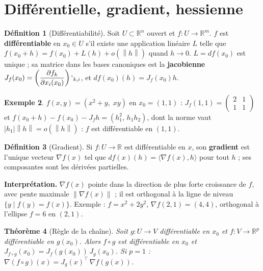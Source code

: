 \documentclass[a4paper,11pt]{report}
\theoremstyle{plain}
\newtheorem{theorem}{Théorème}[]
\theoremstyle{definition}
\newtheorem{definition}[theorem]{Définition}
\newtheorem{exemple}[theorem]{Exemple}
\theoremstyle{remark}
\newcommand{\R}{\mathbb{R}}
\newcommand{\norm}[1]{\left\lVert#1\right\rVert}
\newcommand{\abs}[1]{\left\lvert#1\right\rvert}
\newcommand{\grad}{\nabla}
\newcommand{\T}{^{\!\top}}
\newcommand{\scal}[2]{\langle #1,#2\rangle}
\begin{document}
			\section{Différentielle, gradient, hessienne}
			\begin{definition}[Différentiabilité]
				Soit $U\subset\R^n$ ouvert et $f:U\to\R^m$. $f$ est \textbf{différentiable} en $x_0\in U$ s'il existe une application linéaire $L$ telle que $f(x_0+h)=f(x_0)+L(h)+o(\norm h)$ quand $h\to0$. $L=df(x_0)$ est unique ; sa matrice dans les bases canoniques est la \textbf{jacobienne} $J_f(x_0)=\left( \dfrac{\partial f_k}{\partial x_i(x_0)}\right) `_{k,i}$, et $df(x_0)(h)=J_f(x_0)h$.
			\end{definition}
			\begin{exemple}
				$f(x,y)=(x^2+y,\;xy)$ en $x_0=(1,1)$ : $J_f(1,1)=\begin{pmatrix}2&1\\1&1\end{pmatrix}$ et $f(x_0+h)-f(x_0)-J_f h=(h_1^2,\,h_1h_2)$, dont la norme vaut $\abs{h_1}\norm h=o(\norm h)$ : $f$ est différentiable en $(1,1)$.
			\end{exemple}
			\begin{definition}[Gradient]
				Si $f:U\to\R$ est différentiable en $x$, son \textbf{gradient} est l'unique vecteur $\grad f(x)$ tel que $df(x)(h)=\scal{\grad f(x)}{h}$ pour tout $h$ ; ses composantes sont les dérivées partielles.
			\end{definition}
			\textbf{Interprétation.} $\grad f(x)$ pointe dans la direction de plus forte croissance de $f$, avec pente maximale $\norm{\grad f(x)}$ ; il est orthogonal à la ligne de niveau $\{y\mid f(y)=f(x)\}$. Exemple : $f=x^2+2y^2$, $\grad f(2,1)=(4,4)$, orthogonal à l'ellipse $f=6$ en $(2,1)$.
			\begin{theorem}[Règle de la chaîne]
				Soit $g:U\to V$ différentiable en $x_0$ et $f:V\to\R^p$ différentiable en $g(x_0)$. Alors $f\circ g$ est différentiable en $x_0$ et $J_{f\circ g}(x_0)=J_f(g(x_0))\,J_g(x_0)$. Si $p=1$ : $\grad(f\circ g)(x)=J_g(x)\T\,\grad f(g(x))$.
			\end{theorem}
\end{document}
